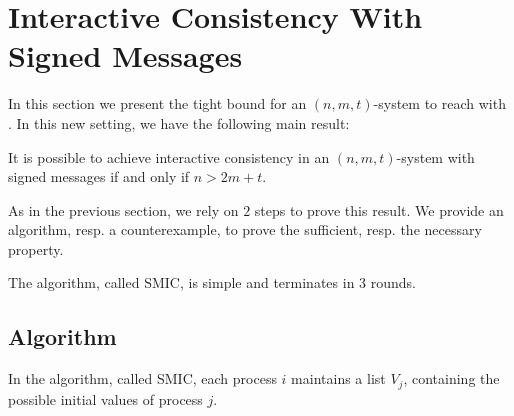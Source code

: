 
\section{Interactive Consistency With Signed Messages}\label{signedMessage}

In this section we present the tight bound for an $( n,m,t )$-system to
reach  with . In this new setting,
we have the following main result:

\begin{theorem}
  \label{consensusSigned} It is possible to achieve  interactive consistency
  in an $( n,m,t )$-system with signed messages  if and only if $n> 2m+t$.
\end{theorem}

As in the previous section, we rely on $2$ steps to prove this result.  We provide an algorithm, resp. a counterexample,  to prove  the sufficient, resp. the necessary property. 

The algorithm, called SMIC, is simple  and terminates in 3 rounds.


\subsection{Algorithm}
In the algorithm, called SMIC, each process $i$ maintains a list $V_{j}$, containing the possible initial values of process $j$.
{}

